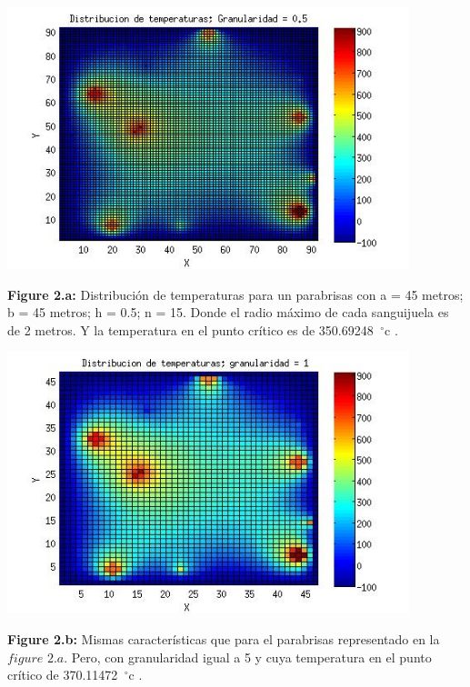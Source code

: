 \includegraphics[width=\textwidth,height=3.0in,keepaspectratio
]{45x45h0,5.jpg} \newline
\begin {flushleft}
\textbf{Figure 2.a:} Distribución de temperaturas para un parabrisas con a = 45 metros; b = 45 metros; h = 0.5; n = 15. Donde el radio máximo de cada sanguijuela es de 2 metros. Y la temperatura en el punto crítico es de  350.69248\hspace{-1.5mm}$\phantom{a}^{\circ}$c .
\end{flushleft}

\includegraphics[width=\textwidth,height=3.0in,keepaspectratio
]{45x45h1.jpg} \newline
\begin {flushleft}
\textbf{Figure 2.b:} Mismas características que para el parabrisas representado en la $figure$ $2.a$. Pero, con granularidad igual a 5 y cuya temperatura en el punto crítico de 370.11472\hspace{-1.5mm}$\phantom{a}^{\circ}$c .
\end{flushleft}

